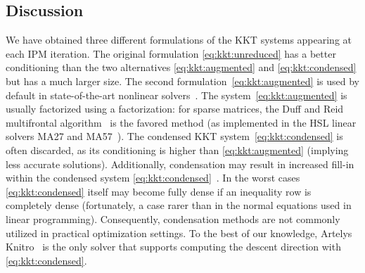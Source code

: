 \subsection{Discussion}

We have obtained three different formulations of the KKT systems
appearing at each IPM iteration.  The original formulation
\eqref{eq:kkt:unreduced} has a better
conditioning than the two alternatives \eqref{eq:kkt:augmented} and
\eqref{eq:kkt:condensed} but has a much larger size.
The second formulation~\eqref{eq:kkt:augmented} is
used by default in state-of-the-art nonlinear solvers~\cite{wachter2006implementation,waltz2006interior}.
The system~\eqref{eq:kkt:augmented} is usually factorized using a \lblt factorization: for sparse matrices, the Duff and Reid
multifrontal algorithm~\cite{duff1983multifrontal} is the favored method (as implemented in the HSL linear solvers MA27 and MA57~\cite{duff2004ma57}).
The condensed KKT system~\eqref{eq:kkt:condensed} is often discarded,
as its conditioning is higher
than \eqref{eq:kkt:augmented} (implying less accurate solutions).
Additionally, condensation may result in increased fill-in within the condensed system \eqref{eq:kkt:condensed}~\cite[Section 19.3, p.571]{nocedal_numerical_2006}.
In the worst cases \eqref{eq:kkt:condensed} itself may become fully dense if an inequality row is completely dense (fortunately, a case rarer than in the normal equations used in linear programming).
Consequently, condensation methods are not commonly utilized in practical optimization settings.
To the best of our knowledge, Artelys Knitro~\cite{waltz2006interior} is the only solver that supports computing the descent direction with \eqref{eq:kkt:condensed}.

